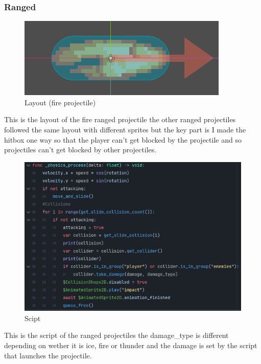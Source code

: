 \documentclass{article}
\begin{document}
        \subsubsection{Ranged}
        \begin{figure}[H]
                \centering
                \includegraphics[width = 0.9\columnwidth]{images/development/FireProjectile_layout.PNG}
                \caption{Layout (fire projectile)}
        \end{figure}
        This is the layout of the fire ranged projectile the other ranged projectiles followed the same layout with different sprites but the key part is I made the hitbox one way so that the player can't get blocked by the projectile and so projectiles can't get blocked by other projectiles.\\
        \begin{figure}[H]
                \centering
                \includegraphics[width = 0.9\columnwidth]{images/development/FireProjectile_script.PNG}
                \caption{Scipt}
        \end{figure}
        This is the script of the ranged projectiles the damage\_type is different depending on wether it is ice, fire or thunder and the damage is set by the script that launches the projectile.\\ 
\end{document}

